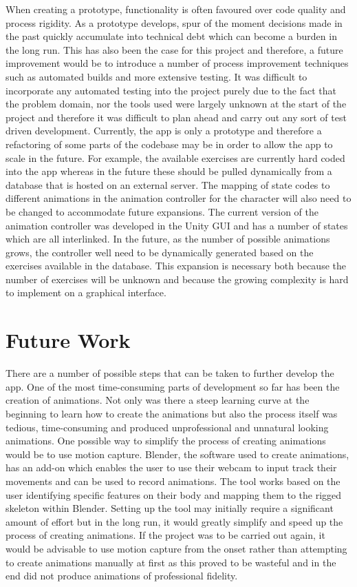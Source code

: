 \documentclass{l4proj}
\begin{document}
When creating a prototype, functionality is often favoured over code quality and process rigidity. As a prototype develops, spur of the moment decisions made in the past quickly accumulate into technical debt which can become a burden in the long run. This has also been the case for this project and therefore, a future improvement would be to introduce a number of process improvement techniques such as automated builds and more extensive testing. It was difficult to incorporate any automated testing into the project purely due to the fact that the problem domain, nor the tools used were largely unknown at the start of the project and therefore it was difficult to plan ahead and carry out any sort of test driven development. Currently, the app is only a prototype and therefore a refactoring of some parts of the codebase may be in order to allow the app to scale in the future. For example, the available exercises are currently hard coded into the app whereas in the future these should be pulled dynamically from a database that is hosted on an external server. The mapping of state codes to different animations in the animation controller for the character will also need to be changed to accommodate future expansions. The current version of the animation controller was developed in the Unity GUI and has a number of states which are all interlinked. In the future, as the number of possible animations grows, the controller well need to be dynamically generated based on the exercises available in the database. This expansion is necessary both because the number of exercises will be unknown and because the growing complexity is hard to implement on a graphical interface. 

\section{Future Work}
There are a number of possible steps that can be taken to further develop the app. One of the most time-consuming parts of development so far has been the creation of animations. Not only was there a steep learning curve at the beginning to learn how to create the animations but also the process itself was tedious, time-consuming and produced unprofessional and unnatural looking animations. One possible way to simplify the process of creating animations would be to use motion capture. Blender, the software used to create animations, has an add-on which enables the user to use their webcam to input track their movements and can be used to record animations. The tool works based on the user identifying specific features on their body and mapping them to the rigged skeleton within Blender. Setting up the tool may initially require a significant amount of effort but in the long run, it would greatly simplify and speed up the process of creating animations. If the project was to be carried out again, it would be advisable to use motion capture from the onset rather than attempting to create animations manually at first as this proved to be wasteful and in the end did not produce animations of professional fidelity. 
\end{document}
